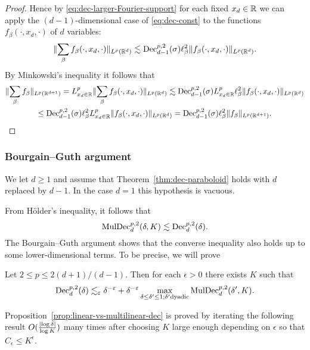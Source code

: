\begin{proof}
Hence by \eqref{eq:dec-larger-Fourier-support} for each fixed $x_{d}\in\mathbb{R}$ we can apply the $(d-1)$-dimensional case of \eqref{eq:dec-const} to the functions $f_{\beta}(\cdot,x_{d},\cdot)$ of $d$ variables:
\[
\lVert \sum_{\beta} f_{\beta}(\cdot,x_{d},\cdot) \rVert_{L^{p}(\mathbb{R}^{d})}
\lesssim
\mathrm{Dec}^{p,2}_{d-1}(\sigma) \ell^{2}_{\beta} \lVert f_{\beta}(\cdot,x_{d},\cdot) \rVert_{L^{p}(\mathbb{R}^{d})}.
\]
By Minkowski's inequality it follows that
\begin{multline*}
\lVert \sum_{\beta} f_{\beta} \rVert_{L^{p}(\mathbb{R}^{d+1})}
=
L^{p}_{x_{d}\in\mathbb{R}} \lVert \sum_{\beta} f_{\beta}(\cdot,x_{d},\cdot) \rVert_{L^{p}(\mathbb{R}^{d})}
\lesssim
\mathrm{Dec}^{p,2}_{d-1}(\sigma) L^{p}_{x_{d}\in\mathbb{R}} \ell^{2}_{\beta} \lVert f_{\beta}(\cdot,x_{d},\cdot) \rVert_{L^{p}(\mathbb{R}^{d})}\\
\leq
\mathrm{Dec}^{p,2}_{d-1}(\sigma) \ell^{2}_{\beta} L^{p}_{x_{d}\in\mathbb{R}} \lVert f_{\beta}(\cdot,x_{d},\cdot) \rVert_{L^{p}(\mathbb{R}^{d})}
=
\mathrm{Dec}^{p,2}_{d-1}(\sigma) \ell^{2}_{\beta} \lVert f_{\beta} \rVert_{L^{p}(\mathbb{R}^{d+1})}.
\qedhere
\end{multline*}
\end{proof}


\subsubsection{Bourgain--Guth argument}\label{sec:gen:bourgain-guth}
We let $d\geq 1$ and assume that Theorem~\ref{thm:dec-paraboloid} holds with $d$ replaced by $d-1$.
In the case $d=1$ this hypothesis is vacuous.

From H\"older's inequality, it follows that
\begin{equation}\label{180713e3.4}
\mathrm{MulDec}_{d}^{p,2}(\delta, K)
\lesssim
\mathrm{Dec}_{d}^{p,2}(\delta).
\end{equation}
The Bourgain--Guth argument shows that the converse inequality also holds up to some lower-dimensional terms.
To be precise, we will prove
\begin{proposition}\label{prop:linear-vs-multilinear-dec}
Let $2 \leq p \leq 2(d+1)/(d-1)$.
Then for each $\epsilon>0$ there exists $K$ such that
\begin{equation}
\mathrm{Dec}_{d}^{p,2}(\delta)
\lesssim_{\varepsilon}
\delta^{-\varepsilon}
+ \delta^{-\varepsilon} \max_{\delta\le \delta'\le 1; \delta' \text{dyadic}} \mathrm{MulDec}_{d}^{p,2}(\delta', K).
\end{equation}
\end{proposition}

Proposition~\ref{prop:linear-vs-multilinear-dec} is proved by iterating the following result $O(\frac{\lvert\log\delta\rvert}{\log K})$ many times after choosing $K$ large enough depending on $\epsilon$ so that $C_{\epsilon} \leq K^{\epsilon}$.

